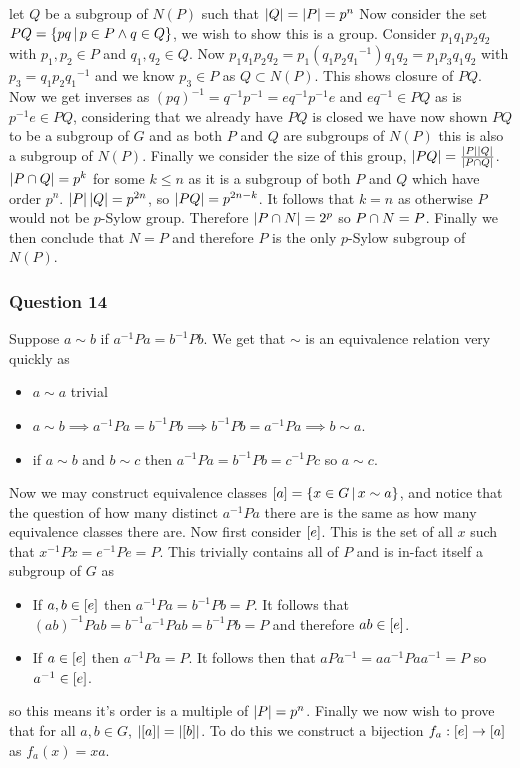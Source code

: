 \documentclass{article}
\begin{document}
let $Q$ be a subgroup of $N(P)$ such that $\left| {Q} \right| = \left| {P} \right| = p^n$ Now consider the set $PQ = \left\{{pq} \,\middle|\, {p \in P\land q\in Q}\right\}$, we wish to show this is a group. Consider $p_1q_1p_2q_2$ with $p_1,p_2 \in P$ and $q_1,q_2\in Q$. Now $p_1q_1p_2q_2 = p_1\left(q_1p_2{q_1}^{-1}\right)q_1q_2 = p_1p_3q_1q_2$ with $p_3 = q_1p_2{q_1}^{-1}$ and we know $p_3 \in P$ as $ Q \subset N(P)$. This shows closure of $PQ$. Now we get inverses as $(pq)^{-1} = q^{-1}p^{-1} = eq^{-1}p^{-1}e$ and $eq^{-1} \in PQ$ as is $p^{-1}e\in PQ$, considering that we already have $PQ$ is closed we have now shown $PQ$ to be a subgroup of $G$ and as both $P$ and $Q$ are subgroups of $N(P)$ this is also a subgroup of $N(P)$. Finally we consider the size of this group, $\left| {PQ} \right| = \frac{\left| {P} \right|\left| {Q} \right|}{\left| {P\cap Q} \right|}$. $\left| {P\cap Q} \right| = p^k$ for some $k \le n$ as it is a subgroup of both $P$ and $Q$ which have order $p^n$. $\left| {P} \right|\left| {Q} \right| = p^{2n}$, so $\left| {PQ} \right| = p^{2n-k}$. It follows that $k = n$ as otherwise $P$ would not be $p$-Sylow group. Therefore $\left| {P\cap N} \right|= 2^p$ so $P\cap N = P$. Finally we then conclude that $N = P$ and therefore $P$ is the only $p$-Sylow subgroup of $N(P)$.



\subsubsection{Question 14}
Suppose $a \sim b$ if $a^{-1}Pa = b^{-1}Pb$. We get that $\sim$ is an equivalence relation very quickly as
\begin{itemize}
	\item $a\sim a$ trivial
	\item $a \sim b \implies a^{-1}Pa=b^{-1}Pb\implies b^{-1}Pb=a^{-1}Pa \implies b\sim a$.
	\item if $a\sim b$ and $b\sim c$ then $a^{-1}Pa =b^{-1}Pb = c^{-1}Pc$ so $a\sim c$.
\end{itemize}

Now we may construct equivalence classes $\left[{a}\right] = \left\{{x\in G} \,\middle|\, {x \sim a}\right\}$, and notice that the question of how many distinct $a^{-1}Pa$ there are is the same as how many equivalence classes there are. Now first consider $\left[{e}\right]$. This is the set of all $x$ such that $x^{-1}Px = e^{-1}Pe = P$. This trivially contains all of $P$ and is in-fact itself a subgroup of $G$ as
\begin{itemize}
	\item If $a, b \in \left[{e}\right]$ then $a^{-1}Pa = b^{-1}Pb = P$. It follows that $\left({ab}\right)^{-1}Pab = b^{-1}a^{-1}Pab = b^{-1}Pb = P$ and therefore $ab \in \left[{e}\right]$.
	\item If $a \in \left[{e}\right]$ then $a^{-1}Pa = P$. It follows then that $aPa^{-1} = aa^{-1}Paa^{-1} = P$ so $a^{-1} \in \left[{e}\right]$.
\end{itemize}
so this means it's order is a multiple of $\left| {P} \right| = p^n$. Finally we now wish to prove that for all $a,b \in G$, $\left| {\left[{a}\right]} \right|=\left| {\left[{b}\right]} \right|$. To do this we construct a bijection $f_a:\left[{e}\right]\to\left[{a}\right]$ as $f_a(x) = xa$.
\end{document}
